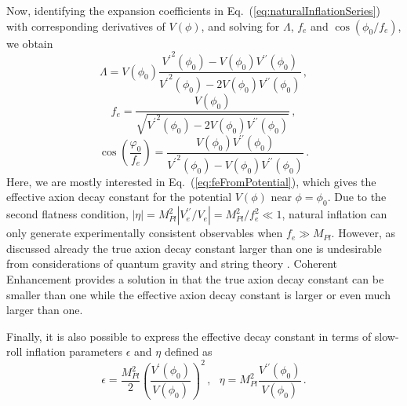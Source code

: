 \documentclass[12pt]{article}
\begin{document}
Now, identifying the expansion coefficients in Eq.~(\ref{eq:naturalInflationSeries}) with corresponding derivatives of $V\left(\phi\right)$, and solving for $\Lambda$, $f_e$ and $\cos\left(\phi_0 / f_e\right)$, we obtain
\begin{equation} \label{eq:lambdaFromPotential}
  \Lambda = V\left(\phi_0\right) \frac
    {{V^\prime}^2\left(\phi_0\right) - V\left(\phi_0\right) V^{\prime\prime}\left(\phi_0\right)}
    {{V^\prime}^2\left(\phi_0\right) - 2 V\left(\phi_0\right) V^{\prime\prime}\left(\phi_0\right)}
  \,,
\end{equation}
\begin{equation} \label{eq:feFromPotential}
  f_e = \frac
    {V\left(\phi_0\right)}
    {\sqrt{{V^\prime}^2\left(\phi_0\right)
      - 2 V\left(\phi_0\right) V^{\prime\prime}\left(\phi_0\right)}}\,,
\end{equation}
\begin{equation} \label{eq:fieldInitialFromPotential}
  \cos\left(\frac{\varphi_0}{f_e}\right) = \frac
    {V\left(\phi_0\right) V^{\prime\prime}\left(\phi_0\right)}
    {{V^\prime}^2\left(\phi_0\right) - V\left(\phi_0\right) V^{\prime\prime}\left(\phi_0\right)}\,.
\end{equation}
Here, we are mostly interested in Eq.~(\ref{eq:feFromPotential}), which gives the effective axion decay constant for the potential $V\left(\phi\right)$ near $\phi = \phi_0$.
Due to the second flatness condition, $\left|\eta\right| = M_{Pl}^2 \left|V_e^{\prime\prime} / V_e\right| = M_{Pl}^2 / f_e^2 \ll 1$, natural inflation can only generate experimentally consistent observables when $f_e \gg M_{Pl}$.
However, as discussed already the true axion decay constant larger than one is undesirable from considerations of quantum gravity and string theory \cite{Kallosh:1995hi, Banks:2003sx}.
Coherent Enhancement provides a solution in that the true axion decay constant can be smaller than one while the effective axion decay constant is larger or even much larger than one.

Finally, it is also possible to express the effective decay constant in terms of slow-roll inflation parameters $\epsilon$ and $\eta$ defined as
\begin{equation} \label{eq:epsEtaFromPotential}
  \epsilon =
    \frac{M_{Pl}^2}{2}
    \left(\frac{V^\prime\left(\phi_0\right)}{V\left(\phi_0\right)}\right)^2\,,
  ~~~ \eta = M_{Pl}^2 \frac{V^{\prime\prime}\left(\phi_0\right)}{V\left(\phi_0\right)}\,.
\end{equation}
\end{document}
